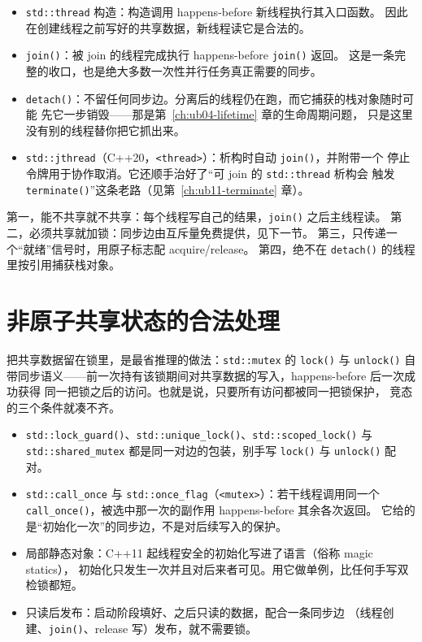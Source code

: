 \documentclass[12pt,a4paper,fontset=fandol]{ctexbook}
\newcommand{\cpp}[1]{C++#1}
\newcommand{\Fn}[1]{\texttt{#1()}}
\newcommand{\Tp}[1]{\texttt{#1}}
\newcommand{\Hdr}[1]{\texttt{<#1>}}
\begin{document}
\begin{itemize}
  \item \Tp{std::thread} 构造：构造调用 happens-before 新线程执行其入口函数。
        因此在创建线程之前写好的共享数据，新线程读它是合法的。
  \item \Fn{join}：被 join 的线程完成执行 happens-before \Fn{join} 返回。
        这是一条完整的收口，也是绝大多数一次性并行任务真正需要的同步。
  \item \Fn{detach}：不留任何同步边。分离后的线程仍在跑，而它捕获的栈对象随时可能
        先它一步销毁——那是第~\ref{ch:ub04-lifetime} 章的生命周期问题，
        只是这里没有别的线程替你把它抓出来。
  \item \Tp{std::jthread}（\cpp{20}，\Hdr{thread}）：析构时自动 \Fn{join}，并附带一个
        停止令牌用于协作取消。它还顺手治好了“可 join 的 \Tp{std::thread} 析构会
        触发 \Fn{terminate}”这条老路（见第~\ref{ch:ub11-terminate} 章）。
\end{itemize}

\begin{guideline}[title={四条不需要内存序知识的并发写法}]
第一，能不共享就不共享：每个线程写自己的结果，\Fn{join} 之后主线程读。
第二，必须共享就加锁：同步边由互斥量免费提供，见下一节。
第三，只传递一个“就绪”信号时，用原子标志配 acquire/release。
第四，绝不在 \Fn{detach} 的线程里按引用捕获栈对象。
\end{guideline}

\section{非原子共享状态的合法处理}\label{sec:ub10-mutex}

把共享数据留在锁里，是最省推理的做法：\Tp{std::mutex} 的 \Fn{lock} 与 \Fn{unlock}
自带同步语义——前一次持有该锁期间对共享数据的写入，happens-before 后一次成功获得
同一把锁之后的访问。也就是说，只要所有访问都被同一把锁保护，
竞态的三个条件就凑不齐。

\begin{itemize}
  \item \Fn{std::lock\_guard}、\Fn{std::unique\_lock}、\Fn{std::scoped\_lock} 与
        \Tp{std::shared\_mutex} 都是同一对边的包装，别手写 \Fn{lock} 与 \Fn{unlock} 配对。
  \item \Tp{std::call\_once} 与 \Tp{std::once\_flag}（\Hdr{mutex}）：若干线程调用同一个
        \Fn{call\_once}，被选中那一次的副作用 happens-before 其余各次返回。
        它给的是“初始化一次”的同步边，不是对后续写入的保护。
  \item 局部静态对象：\cpp{11} 起线程安全的初始化写进了语言（俗称 magic statics），
        初始化只发生一次并且对后来者可见。用它做单例，比任何手写双检锁都短。
  \item 只读后发布：启动阶段填好、之后只读的数据，配合一条同步边
        （线程创建、\Fn{join}、release 写）发布，就不需要锁。
\end{itemize}
\end{document}
